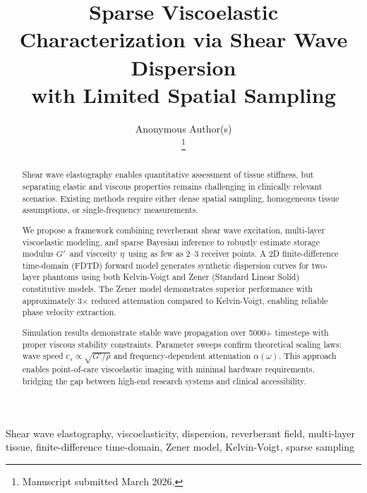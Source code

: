 \documentclass[journal,twoside,a4paper]{IEEEtran}
\newcommand{\Gprime}{$G'$}
\newcommand{\etav}{\ensuremath{\eta}}
\begin{document}
\title{Sparse Viscoelastic Characterization via Shear Wave Dispersion \\
with Limited Spatial Sampling}

\author{Anonymous Author(s)\\
\thanks{Manuscript submitted March 2026.}}

\maketitle

\begin{abstract}
Shear wave elastography enables quantitative assessment of tissue stiffness, 
but separating elastic and viscous properties remains challenging in 
clinically relevant scenarios. Existing methods require either dense spatial 
sampling, homogeneous tissue assumptions, or single-frequency measurements.

We propose a framework combining reverberant shear wave excitation, 
multi-layer viscoelastic modeling, and sparse Bayesian inference to 
robustly estimate storage modulus \Gprime\ and viscosity \etav\ using as few 
as 2--3 receiver points. A 2D finite-difference time-domain (FDTD) forward 
model generates synthetic dispersion curves for two-layer phantoms using 
both Kelvin-Voigt and Zener (Standard Linear Solid) constitutive models. 
The Zener model demonstrates superior performance with approximately 
3$\times$ reduced attenuation compared to Kelvin-Voigt, enabling reliable 
phase velocity extraction.

Simulation results demonstrate stable wave propagation over 5000+ timesteps 
with proper viscous stability constraints. Parameter sweeps confirm 
theoretical scaling laws: wave speed $c_s \propto \sqrt{G'/\rho}$ and 
frequency-dependent attenuation $\alpha(\omega)$. This approach enables 
point-of-care viscoelastic imaging with minimal hardware requirements, 
bridging the gap between high-end research systems and clinical accessibility.
\end{abstract}

\begin{IEEEkeywords}
Shear wave elastography, viscoelasticity, dispersion, reverberant field, 
multi-layer tissue, finite-difference time-domain, Zener model, 
Kelvin-Voigt, sparse sampling
\end{IEEEkeywords}
\end{document}
